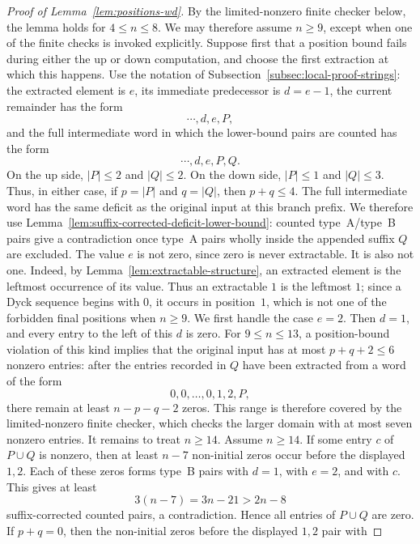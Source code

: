 \documentclass[11pt]{article}
\theoremstyle{plain}
\theoremstyle{definition}
\theoremstyle{remark}
\begin{document}
\begin{proof}[Proof of Lemma~\ref{lem:positions-wd}]
By the limited-nonzero finite checker below, the lemma holds for
\(4\le n\le 8\).  We may therefore assume \(n\ge 9\), except when one of the
finite checks is invoked explicitly.
Suppose first that a position bound fails during either the \(\mathrm{up}\) or
\(\mathrm{down}\) computation, and choose the first extraction at which this
happens.  Use the notation of Subsection~\ref{subsec:local-proof-strings}: the
extracted element is \(e\), its immediate predecessor is \(d=e-1\), the current
remainder has the form
\[
  \cdots,d,e,P,
\]
and the full intermediate word in which the lower-bound pairs are counted has the form
\[
  \cdots,d,e,P,Q.
\]
On the \(\mathrm{up}\) side, \(|P|\le 2\) and \(|Q|\le 2\).  On the
\(\mathrm{down}\) side, \(|P|\le 1\) and \(|Q|\le 3\).  Thus, in either case,
if \(p=|P|\) and \(q=|Q|\), then \(p+q\le 4\).  The full intermediate word has
the same deficit as the original input at this branch prefix.  We
therefore use Lemma~\ref{lem:suffix-corrected-deficit-lower-bound}: counted
type~A/type~B pairs give a contradiction once type~A pairs wholly inside the
appended suffix \(Q\) are excluded.
The value \(e\) is not zero, since zero is never extractable.  It is also not
one.  Indeed, by Lemma~\ref{lem:extractable-structure}, an extracted element is
the leftmost occurrence of its value.  Thus an extractable \(1\) is the
leftmost \(1\); since a Dyck sequence begins with \(0\), it occurs in
position~\(1\), which is not one of the forbidden final positions when
\(n\ge9\).
We first handle the case \(e=2\).  Then \(d=1\), and every entry to the left of
this \(d\) is zero.  For \(9\le n\le 13\), a position-bound violation of this
kind implies that the original input has at most \(p+q+2\le 6\) nonzero entries:
after the entries recorded in \(Q\) have been extracted from a word of the form
\[
  0,0,\ldots,0,1,2,P,
\]
there remain at least \(n-p-q-2\) zeros.  This range is therefore covered by
the limited-nonzero finite checker, which checks the larger domain with at most
seven nonzero entries.  It remains to treat \(n\ge 14\).
Assume \(n\ge 14\).  If some entry \(c\) of \(P\cup Q\) is nonzero, then at
least \(n-7\) non-initial zeros occur before the displayed \(1,2\).  Each of
these zeros forms type~B pairs with \(d=1\), with \(e=2\), and with
\(c\).  This gives at least
\[
  3(n-7)=3n-21>2n-8
\]
suffix-corrected counted pairs, a contradiction.  Hence all entries of
\(P\cup Q\) are zero.
If \(p+q=0\), then the non-initial zeros before the displayed \(1,2\) pair with

\end{proof}
\end{document}
